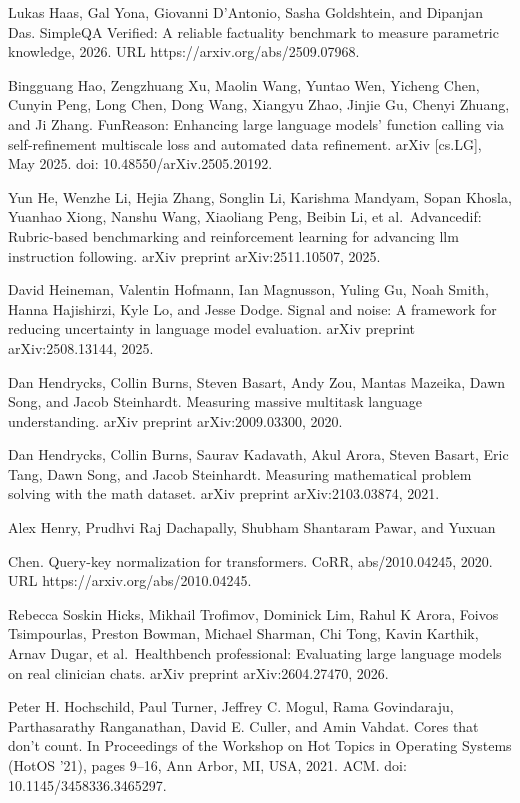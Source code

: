 \documentclass[
  10
]{article}
\begin{document}
Lukas Haas, Gal Yona, Giovanni D'Antonio, Sasha Goldshtein, and Dipanjan
Das. SimpleQA Verified: A reliable factuality benchmark to measure
parametric knowledge, 2026. URL https://arxiv.org/abs/2509.07968.

Bingguang Hao, Zengzhuang Xu, Maolin Wang, Yuntao Wen, Yicheng Chen,
Cunyin Peng, Long Chen, Dong Wang, Xiangyu Zhao, Jinjie Gu, Chenyi
Zhuang, and Ji Zhang. FunReason: Enhancing large language models'
function calling via self-refinement multiscale loss and automated data
refinement. arXiv {[}cs.LG{]}, May 2025. doi: 10.48550/arXiv.2505.20192.

Yun He, Wenzhe Li, Hejia Zhang, Songlin Li, Karishma Mandyam, Sopan
Khosla, Yuanhao Xiong, Nanshu Wang, Xiaoliang Peng, Beibin Li, et
al.~Advancedif: Rubric-based benchmarking and reinforcement learning for
advancing llm instruction following. arXiv preprint arXiv:2511.10507,
2025.

David Heineman, Valentin Hofmann, Ian Magnusson, Yuling Gu, Noah Smith,
Hanna Hajishirzi, Kyle Lo, and Jesse Dodge. Signal and noise: A
framework for reducing uncertainty in language model evaluation. arXiv
preprint arXiv:2508.13144, 2025.

Dan Hendrycks, Collin Burns, Steven Basart, Andy Zou, Mantas Mazeika,
Dawn Song, and Jacob Steinhardt. Measuring massive multitask language
understanding. arXiv preprint arXiv:2009.03300, 2020.

Dan Hendrycks, Collin Burns, Saurav Kadavath, Akul Arora, Steven Basart,
Eric Tang, Dawn Song, and Jacob Steinhardt. Measuring mathematical
problem solving with the math dataset. arXiv preprint arXiv:2103.03874,
2021.

Alex Henry, Prudhvi Raj Dachapally, Shubham Shantaram Pawar, and Yuxuan

Chen. Query-key normalization for transformers. CoRR, abs/2010.04245,
2020. URL https://arxiv.org/abs/2010.04245.

Rebecca Soskin Hicks, Mikhail Trofimov, Dominick Lim, Rahul K Arora,
Foivos Tsimpourlas, Preston Bowman, Michael Sharman, Chi Tong, Kavin
Karthik, Arnav Dugar, et al.~Healthbench professional: Evaluating large
language models on real clinician chats. arXiv preprint
arXiv:2604.27470, 2026.

Peter H. Hochschild, Paul Turner, Jeffrey C. Mogul, Rama Govindaraju,
Parthasarathy Ranganathan, David E. Culler, and Amin Vahdat. Cores that
don't count. In Proceedings of the Workshop on Hot Topics in Operating
Systems (HotOS '21), pages 9--16, Ann Arbor, MI, USA, 2021. ACM. doi:
10.1145/3458336.3465297.
\end{document}
